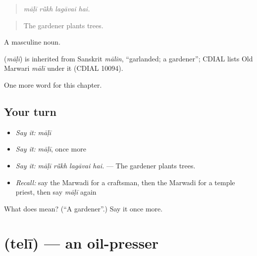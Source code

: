 \begin{quote}
   
\end{quote}

\begin{quote}
\emph{māḷī rū̃kh lagāvai hai.}
\end{quote}

\begin{quote}
The gardener plants trees.
\end{quote}

A masculine noun.

\begin{cousinweb}
\textbf{} (\emph{māḷī}) is inherited from Sanskrit \emph{mālin}, \textquotedblleft{}garlanded; a gardener\textquotedblright{}; CDIAL lists Old Marwari \emph{mālī} under it (CDIAL 10094).
\end{cousinweb}

\begin{grammarlens}[title={What you've built}]
One more word for this chapter.
\end{grammarlens}

\subsection*{Your turn}
\begin{itemize}
\raggedright
  \item \emph{Say it:} \emph{māḷī}
  \item \emph{Say it:} \emph{māḷī}, once more
  \item \emph{Say it:} \emph{māḷī rū̃kh lagāvai hai.} — The gardener plants trees.
  \item \emph{Recall:} say the Marwadi for a craftsman, then the Marwadi for a temple priest, then say \emph{māḷī} again
\end{itemize}

\begin{tcolorbox}[breakable,colback=teal!4,colframe=teal!35!black,title={Before you move on}]
What does  mean? (\textquotedblleft{}A gardener\textquotedblright{}.) Say it once more.
\end{tcolorbox}
\section[\texorpdfstring{\mw{तेली} (telī)}{तेली (telī)}]{ (telī) — an oil-presser}

\label{lesson:MW-C263-teli}



